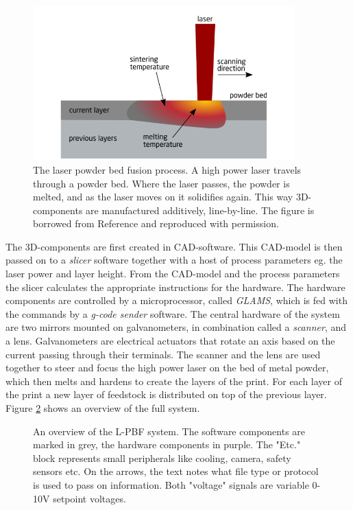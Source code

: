 \begin{figure}[t]
    \centering
    \includegraphics[width=0.9\textwidth]{Pictures/lpbf.png}
    \caption{The laser powder bed fusion process. A high power laser travels through a powder bed. Where the laser passes, the powder is melted, and as the laser moves on it solidifies again. This way 3D-components are manufactured additively, line-by-line. The figure is borrowed from Reference \cite[Fig. 2.4]{sebastian-phd} and reproduced with permission.}
    \label{fig:lpbf}
\end{figure}

The 3D-components are first created in CAD-software. This CAD-model is then passed on to a \textit{slicer} software together with a host of process parameters eg. the laser power and layer height. From the CAD-model and the process parameters the slicer calculates the appropriate instructions for the hardware. The hardware components are controlled by a microprocessor, called \textit{GLAMS}, which is fed with the commands by a \textit{g-code sender} software. The central hardware of the system are two mirrors mounted on galvanometers, in combination called a \textit{scanner}, and a lens. Galvanometers are electrical actuators that rotate an axis based on the current passing through their terminals. The scanner and the lens are used together to steer and focus the high power laser on the bed of metal powder, which then melts and hardens to create the layers of the print. For each layer of the print a new layer of feedstock is distributed on top of the previous layer. Figure \ref{fig:system-overview} shows an overview of the full system.

\begin{figure}
    \sffamily
    \centering
    
    \caption{An overview of the L-PBF system. The software components are marked in grey, the hardware components in purple. The "Etc." block represents small peripherals like cooling, camera, safety sensors etc. On the arrows, the text notes what file type or protocol is used to pass on information. Both "voltage" signals are variable 0-10V setpoint voltages.}
    \label{fig:system-overview}
\end{figure}

